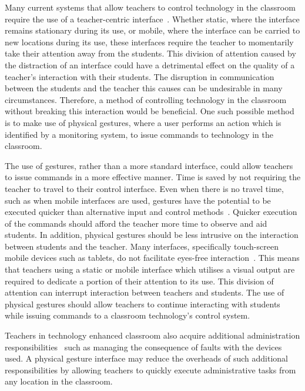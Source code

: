 \documentclass[manuscript, review, screen]{acmart}
\begin{document}
Many current systems that allow teachers to control technology in the classroom require the use of a teacher-centric interface~\cite{Dagdag2011,Kuhn2005,Vila,Zhou2010}.
Whether static, where the interface remains stationary during its use, or mobile, where the interface can be carried to new locations during its use, these interfaces require the teacher to momentarily take their attention away from the students.
This division of attention caused by the distraction of an interface could have a detrimental effect on the quality of a teacher's interaction with their students.
The disruption in communication between the students and the teacher this causes can be undesirable in many circumstances.
Therefore, a method of controlling technology in the classroom without breaking this interaction would be beneficial.
One such possible method is to make use of physical gestures, where a user performs an action which is identified by a monitoring system, to issue commands to technology in the classroom.

The use of gestures, rather than a more standard interface, could allow teachers to issue commands in a more effective manner.
Time is saved by not requiring the teacher to travel to their control interface.
Even when there is no travel time, such as when mobile interfaces are used, gestures have the potential to be executed quicker than alternative input and control methods~\cite{Dulberg1999,Moyle2001}.
Quicker execution of the commands should afford the teacher more time to observe and aid students.
In addition, physical gestures should be less intrusive on the interaction between students and the teacher. 
Many interfaces, specifically touch-screen mobile devices such as tablets, do not facilitate eyes-free interaction~\cite{Brewster2003}.
This means that teachers using a static or mobile interface which utilises a visual output are required to dedicate a portion of their attention to its use.
This division of attention can interrupt interaction between teachers and students.
The use of physical gestures should allow teachers to continue interacting with students while issuing commands to a classroom technology's control system.

Teachers in technology enhanced classroom also acquire additional administration responsibilities~\cite{Kuhn2005} such as managing the consequence of faults with the devices used.
A physical gesture interface may reduce the overheads of such additional responsibilities by allowing teachers to quickly execute administrative tasks from any location in the classroom.
\end{document}

